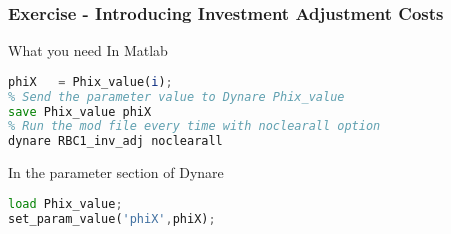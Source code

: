 \documentclass[xcolor=dvipsnames,handout,aspectratio=169]{beamer}
\begin{document}
\begin{frame}[containsverbatim]\frametitle{\textbf{Exercise - Introducing Investment Adjustment Costs}}
 What you need
  In Matlab

\begin{lstlisting}[language=Octave]  
% Give to Phix the value of every iteration
phiX   = Phix_value(i); 
% Send the parameter value to Dynare Phix_value       
save Phix_value phiX  
% Run the mod file every time with noclearall option        
dynare RBC1_inv_adj noclearall
\end{lstlisting}

In the parameter section of Dynare 

\begin{lstlisting}[language=Octave]
load Phix_value;
set_param_value('phiX',phiX); 
\end{lstlisting}
\end{frame}






 
\end{document}
